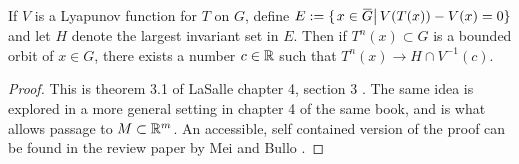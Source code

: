 \begin{thm}\label{thm:invariance}\ \\%
	If \( V \) is a Lyapunov function for \( T \)  on \( G \), define \( E\defined\{\left.x\in\overbar G\right|V(T(x))-V(x)=0\} \) and let \( H \) denote the largest invariant set in \( E \). Then if \( T^n(x)\subset G \) is a bounded orbit of \( x\in G \), there exists a number \( c\in\mathbb R \) such that \( T^n(x)\rightarrow H\cap V^{-1}(c) \).
\end{thm}

\begin{proof}
	This is theorem 3.1 of LaSalle chapter 4, section 3 \cite{lasalle1976dynsys}. The same idea is explored in a more general setting in chapter 4 of the same book, and is what allows passage to \( M\subset\mathbb R^m \). An accessible, self contained version of the proof can be found in the review paper by Mei and Bullo \cite{mei2017lasalle}.
\end{proof}
%
%		